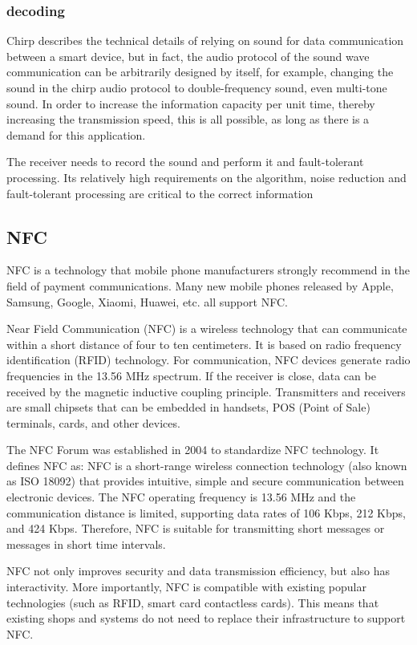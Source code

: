 \documentclass[journal]{IEEEtran}
\begin{document}
\subsubsection{decoding}

Chirp describes the technical details of relying on sound for data communication between a smart device, but in fact, the audio protocol of the sound wave communication can be arbitrarily designed by itself, for example, changing the sound in the chirp audio protocol to double-frequency sound, even multi-tone sound. In order to increase the information capacity per unit time, thereby increasing the transmission speed, this is all possible, as long as there is a demand for this application.

The receiver needs to record the sound and perform it and fault-tolerant processing. Its relatively high requirements on the algorithm, noise reduction and fault-tolerant processing are critical to the correct information

\subsection{NFC}
NFC is a technology that mobile phone manufacturers strongly recommend in the field of payment communications. Many new mobile phones released by Apple, Samsung, Google, Xiaomi, Huawei, etc. all support NFC. 


Near Field Communication (NFC) is a wireless technology that can communicate within a short distance of four to ten centimeters. It is based on radio frequency identification (RFID) technology. For communication, NFC devices generate radio frequencies in the 13.56 MHz spectrum. If the receiver is close, data can be received by the magnetic inductive coupling principle. Transmitters and receivers are small chipsets that can be embedded in handsets, POS (Point of Sale) terminals, cards, and other devices.


The NFC Forum was established in 2004 to standardize NFC technology. It defines NFC as: NFC is a short-range wireless connection technology (also known as ISO 18092) that provides intuitive, simple and secure communication between electronic devices. The NFC operating frequency is 13.56 MHz and the communication distance is limited, supporting data rates of 106 Kbps, 212 Kbps, and 424 Kbps. Therefore, NFC is suitable for transmitting short messages or messages in short time intervals.

NFC not only improves security and data transmission efficiency, but also has interactivity. More importantly, NFC is compatible with existing popular technologies (such as RFID, smart card contactless cards). This means that existing shops and systems do not need to replace their infrastructure to support NFC.
\end{document}
